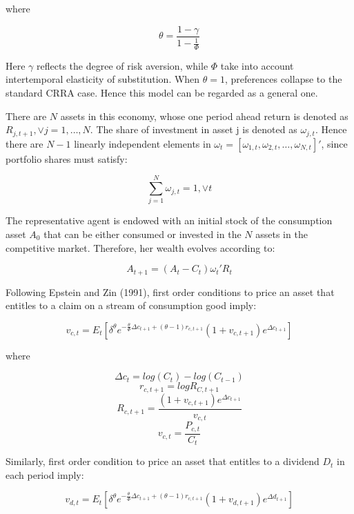 \documentclass[a4paper,12pt]{scrartcl} %
\begin{document}
where

\begin{equation}\label{50}
\theta=\frac{1-\gamma}{1-\frac{1}{\Phi}}
\end{equation}

Here $\gamma$ reflects the degree of risk aversion, while $\Phi$ take into account intertemporal elasticity of substitution. When $\theta=1$, preferences collapse to the standard CRRA case. Hence this model can be regarded as a general one.

There are $N$ assets in this economy, whose one period ahead return is denoted as $R_{j,t+1},\vee j = 1,\dots,N$. The share of investment in asset j is denoted as $\omega_{j,t}$. Hence there are $N-1$ linearly independent elements in $\omega_t =
[\omega_{1,t},\omega_{2,t},\dots,\omega_{N,t}]'$, since portfolio shares must satisfy:

\begin{equation}\label{51}
\sum_{j=1}^{N}\omega_{j,t}=1,\vee t
\end{equation}

The representative agent is endowed with an initial stock of the consumption asset $A_0$ that can be either consumed or invested in the $N$ assets in the competitive market. Therefore, her wealth evolves according to:

\begin{equation}\label{52}
A_{t+1}=(A_t-C_t)\omega_t'R_t
\end{equation}

Following Epstein and Zin (1991), first order conditions to price an asset that entitles to a claim on a stream of consumption good imply:

\begin{equation}\label{53}
v_{c,t}=E_t[\delta^{\theta}e^{-\frac{\theta}{\Phi}\Delta c_{t+1}+(\theta-1)r_{c,t+1}}(1+v_{c,t+1})e^{\Delta c_{t+1}}]
\end{equation}

where

$$\Delta c_t=log(C_t)-log(C_{t-1})$$
$$r_{c,t+1}=logR_{C,t+1}$$
$$R_{c,t+1}=\frac{(1+v_{c,t+1})e^{\Delta c_{t+1}}}{v_{c,t}}$$
$$v_{c,t}=\frac{P_{c,t}}{C_t}$$

Similarly, first order condition to price an asset that entitles to a dividend $D_t$ in each period imply:

\begin{equation}\label{54}
v_{d,t}=E_t[\delta^{\theta}e^{-\frac{\theta}{\Phi}\Delta c_{t+1}+(\theta-1)r_{c,t+1}}(1+v_{d,t+1})e^{\Delta d_{t+1}}]
\end{equation}
\end{document}
